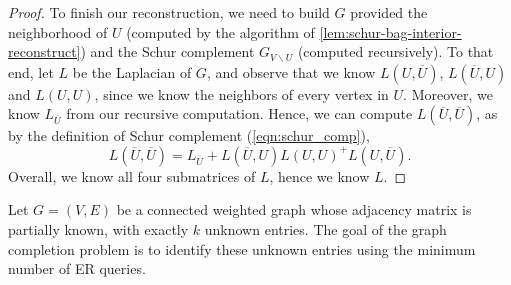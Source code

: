 {\begin{proof}
    To finish our reconstruction, we need to build $G$ provided the neighborhood of $U$ (computed by the algorithm of \cref{lem:schur-bag-interior-reconstruct}) and the Schur complement $G_{V\backslash U}$ (computed recursively). To that end, let $L$ be the Laplacian of $G$, and observe that we know $L(U, \overline{U})$, $L(\overline{U}, U)$ and $L(U, U)$, since we know the neighbors of every vertex in $U$.  Moreover, we know $L_{\overline{U}}$ from our recursive computation. Hence, we can compute $L(\overline{U}, \overline{U})$, as by the definition of Schur complement (\cref{eqn:schur_comp}), 
    \[
    L(\overline{U}, \overline{U}) = L_{\overline{U}} + L(\overline{U},U)L(U, U)^{+}L(U, \overline{U}).
    \]
    Overall, we know all four submatrices of $L$, hence we know $L$.
\end{proof}
}

Let $G = (V, E)$ be a connected weighted graph whose adjacency matrix is partially known, with exactly $k$ unknown entries. The goal of the graph completion problem is to identify these unknown entries using the minimum number of ER queries.

